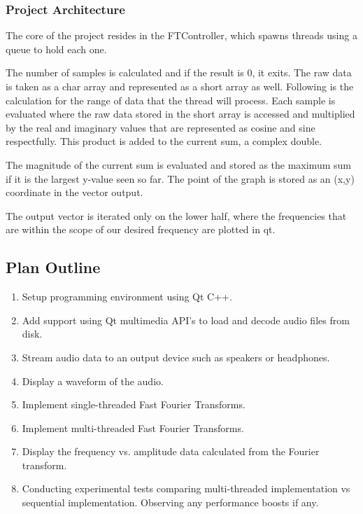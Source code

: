 \documentclass[journal]{IEEEtran}
\begin{document}
\subsubsection{Project Architecture}
    \par{The core of the project resides in the FTController, which spawns threads using a queue to hold each one.}
    \par{The number of samples is calculated and if the result is 0, it exits.  The raw data is taken as a char array and represented as a short array as well. Following is the calculation for the range of data that the thread will process. Each sample is evaluated where the raw data stored in the short array is accessed and multiplied by the real and imaginary values that are represented as cosine and sine respectfully. This product is added to the current sum, a complex double.}
    \par{The magnitude of the current sum is evaluated and stored as the maximum sum if it is the largest y-value seen so far. The point of the graph is stored as an (x,y) coordinate in the vector output.}
    \par{The output vector is iterated only on the lower half, where the frequencies that are within the scope of our desired frequency are plotted in qt.}

\subsection{Plan Outline}

\begin{enumerate}
	\item Setup programming environment using Qt C++.
	\item Add support using Qt multimedia API's to load and decode audio files from disk.
	\item Stream audio data to an output device such as speakers or headphones.
	\item Display a waveform of the audio.
	\item Implement single-threaded Fast Fourier Transforms.
	\item Implement multi-threaded Fast Fourier Transforms.
	\item Display the frequency vs. amplitude data calculated from the Fourier transform.
	\item Conducting experimental tests comparing multi-threaded implementation vs sequential implementation.
Observing any performance boosts if any.
\end{enumerate}
\end{document}
